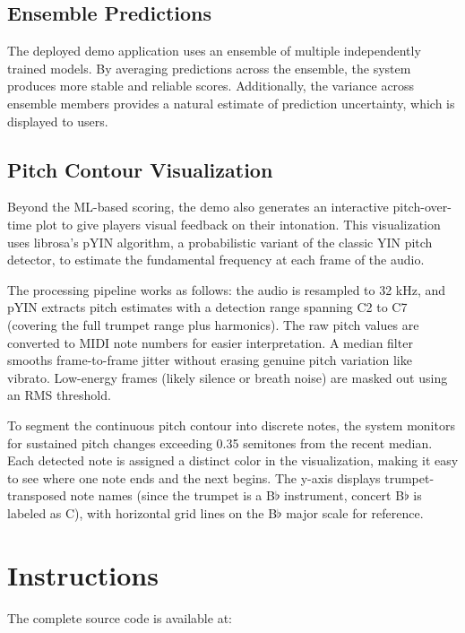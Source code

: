 \documentclass[10pt, a4paper, twocolumn]{article}
\begin{document}
\subsection*{Ensemble Predictions}

The deployed demo application uses an ensemble of multiple independently trained models. By averaging predictions across the ensemble, the system produces more stable and reliable scores. Additionally, the variance across ensemble members provides a natural estimate of prediction uncertainty, which is displayed to users.

\subsection*{Pitch Contour Visualization}

Beyond the ML-based scoring, the demo also generates an interactive pitch-over-time plot to give players visual feedback on their intonation. This visualization uses librosa's pYIN algorithm, a probabilistic variant of the classic YIN pitch detector, to estimate the fundamental frequency at each frame of the audio.

The processing pipeline works as follows: the audio is resampled to 32 kHz, and pYIN extracts pitch estimates with a detection range spanning C2 to C7 (covering the full trumpet range plus harmonics). The raw pitch values are converted to MIDI note numbers for easier interpretation. A median filter smooths frame-to-frame jitter without erasing genuine pitch variation like vibrato. Low-energy frames (likely silence or breath noise) are masked out using an RMS threshold.

To segment the continuous pitch contour into discrete notes, the system monitors for sustained pitch changes exceeding 0.35 semitones from the recent median. Each detected note is assigned a distinct color in the visualization, making it easy to see where one note ends and the next begins. The y-axis displays trumpet-transposed note names (since the trumpet is a B$\flat$ instrument, concert B$\flat$ is labeled as C), with horizontal grid lines on the B$\flat$ major scale for reference.

\section{Instructions}

The complete source code is available at:
\end{document}
